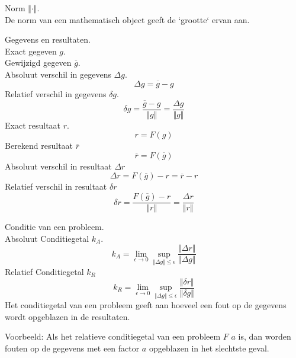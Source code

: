 \documentclass[samenvatting.tex]{subfiles}
\begin{document}
\begin{defi}
Norm $\Vert \cdot \Vert$.\\
De norm van een mathematisch object geeft de `grootte` ervan aan.
\end{defi}
\begin{defi} Gegevens en resultaten.\\
Exact gegeven $g$.\\
Gewijzigd gegeven $\overline{g}$.\\
Absoluut verschil in gegevens $\Delta g$.
\[
\Delta g = \overline{g} - g
\]
Relatief verschil in gegevens $\delta g$.
\[
\delta g
= \frac{\overline{g} - g}{\Vert g \Vert}
= \frac{\Delta g}{\Vert g \Vert}
\]
Exact resultaat $r$.
\[
r = F(g)
\]
Berekend resultaat $\overline{r}$
\[
\overline{r} = F(\overline{g})
\]
Absoluut verschil in resultaat $\Delta r$
\[
\Delta r
= F(\overline{g}) - r
= \overline{r} - r
\]
Relatief verschil in resultaat $\delta r$
\[
\delta r
= \frac{F(\overline{g}) - r}{\Vert r \Vert}
= \frac{\Delta r}{\Vert r \Vert}
\]
\end{defi}
\begin{defi}
Conditie van een probleem.\\
Absoluut Conditiegetal $k_A$.
\[
k_A =
\lim_{\epsilon \rightarrow 0}\sup_{\Vert \Delta g\Vert \le \epsilon} \frac{\Vert \Delta r\Vert}{\Vert \Delta g \Vert}
\]
Relatief Conditiegetal $k_R$
\[
k_R =
\lim_{\epsilon \rightarrow 0}\sup_{\Vert \Delta g\Vert \le \epsilon} \frac{\Vert \delta r\Vert}{\Vert \delta g \Vert}
\]
Het conditiegetal van een probleem geeft aan hoeveel een fout op de gegevens wordt opgeblazen in de resultaten.
\end{defi}
\noindent Voorbeeld: Als het relatieve conditiegetal van een probleem $F$ $a$ is, dan worden fouten op de gegevens met een factor $a$ opgeblazen in het slechtste geval.
\end{document}
